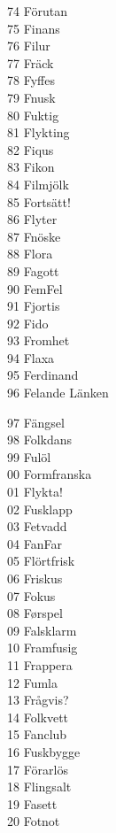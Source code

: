 \documentclass[a6paper, 10pt, twoside]{article}
\begin{document}
\begin{lyrics}
\begin{minipage}[t]{0.3\textwidth}
74 Förutan\\
75 Finans\\
76 Filur\\
77 Fräck\\
78 Fyffes\\
79 Fnusk\\
80 Fuktig\\
81 Flykting\\
82 Fiqus\\
83 Fikon\\
84 Filmjölk\\
85 Fortsätt!\\
86 Flyter\\
87 Fnöske\\
88 Flora\\
89 Fagott\\
90 FemFel\\
91 Fjortis\\
92 Fido\\
93 Fromhet\\
94 Flaxa\\
95 Ferdinand\\
96 Felande\physicalonly{\\} Länken\physicalonly{\\}\end{minipage}\begin{minipage}[t]{0.3\textwidth}\small %
97 Fängsel\\
98 Folkdans\\
99 Fulöl\\
00 Formfranska\\
01 Flykta!\\
02 Fusklapp\\
03 Fetvadd\\
04 FanFar\\
05 Flörtfrisk\\
06 Friskus\\
07 Fokus\\
08 Førspel\\
09 Falsklarm\\
10 Framfusig\\
11 Frappera\\
12 Fumla\\
13 Frågvis?\\
14 Folkvett\\
15 Fanclub\\
16 Fuskbygge\\
17 Förarlös\\
18 Flingsalt\\
19 Fasett\\
20 Fotnot
\end{minipage}
\end{lyrics}
\end{document}
